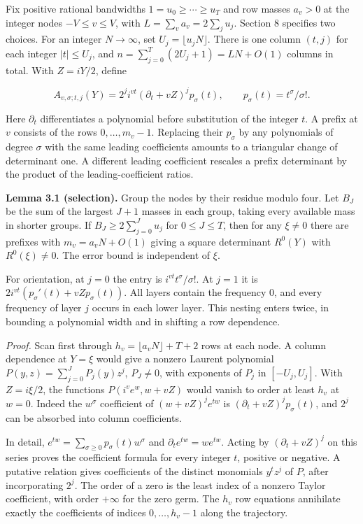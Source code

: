 \documentclass[11pt,a4paper]{article}
\begin{document}
Fix positive rational bandwidths \(1=u_0\ge\cdots\ge u_T\) and row masses \(a_v>0\) at the integer nodes \(-V\le v\le V\), with \(L=\sum_v a_v=2\sum_j u_j\). Section 8 specifies two choices. For an integer \(N\to\infty\), set \(U_j=\lfloor u_jN\rfloor\). There is one column \((t,j)\) for each integer \(|t|\le U_j\), and \(n=\sum_{j=0}^T(2U_j+1)=LN+O(1)\) columns in total. With \(Z=iY/2\), define

\[
 A_{v,\sigma;t,j}(Y)=2^j i^{vt}(\partial_t+vZ)^j p_\sigma(t),\qquad
 p_\sigma(t)=t^\sigma/\sigma! .                                           \tag{6}\label{eq:6}
\]

Here \(\partial_t\) differentiates a polynomial before substitution of the integer \(t\). A prefix at \(v\) consists of the rows \(0,\ldots,m_v-1\). Replacing their \(p_\sigma\) by any polynomials of degree \(\sigma\) with the same leading coefficients amounts to a triangular change of determinant one. A different leading coefficient rescales a prefix determinant by the product of the leading-coefficient ratios.

\textbf{Lemma 3.1 (selection).} Group the nodes by their residue modulo four. Let \(B_J\) be the sum of the largest \(J+1\) masses in each group, taking every available mass in shorter groups. If \(B_J\ge2\sum_{j=0}^J u_j\) for \(0\le J\le T\), then for any \(\xi\ne0\) there are prefixes with \(m_v=a_v N+O(1)\) giving a square determinant \(R^0(Y)\) with \(R^0(\xi)\ne0\). The error bound is independent of \(\xi\).

For orientation, at \(j=0\) the entry is \(i^{vt}t^\sigma/\sigma!\). At \(j=1\) it is \(2i^{vt}(p_\sigma'(t)+vZp_\sigma(t))\). All layers contain the frequency \(0\), and every frequency of layer \(j\) occurs in each lower layer. This nesting enters twice, in bounding a polynomial width and in shifting a row dependence.

\emph{Proof.} Scan first through \(h_v=\lfloor a_vN\rfloor+T+2\) rows at each node. A column dependence at \(Y=\xi\) would give a nonzero Laurent polynomial \(P(y,z)=\sum_{j=0}^JP_j(y)z^j\), \(P_J\ne0\), with exponents of \(P_j\) in \([-U_j,U_j]\). With \(Z=i\xi/2\), the functions \(P(i^ve^w,w+vZ)\) would vanish to order at least \(h_v\) at \(w=0\). Indeed the \(w^\sigma\) coefficient of \((w+vZ)^je^{tw}\) is \((\partial_t+vZ)^jp_\sigma(t)\), and \(2^j\) can be absorbed into column coefficients.

In detail, \(e^{tw}=\sum_{\sigma\ge0}p_\sigma(t)w^\sigma\) and \(\partial_t e^{tw}=we^{tw}\). Acting by \((\partial_t+vZ)^j\) on this series proves the coefficient formula for every integer \(t\), positive or negative. A putative relation gives coefficients of the distinct monomials \(y^t z^j\) of \(P\), after incorporating \(2^j\). The order of a zero is the least index of a nonzero Taylor coefficient, with order \(+\infty\) for the zero germ. The \(h_v\) row equations annihilate exactly the coefficients of indices \(0,\ldots,h_v-1\) along the trajectory.
\end{document}
